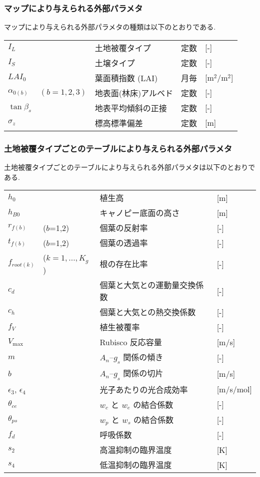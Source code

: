\subsubsection{マップにより与えられる外部パラメタ}

マップにより与えられる外部パラメタの種類は以下のとおりである. 

\begin{tabular}{lllll}
 $I_L$ & & 土地被覆タイプ   & 定数 & [-] \\
 $I_S$ & & 土壌タイプ       & 定数 & [-] \\
 $LAI_0$ & & 葉面積指数 (LAI) & 月毎 & [m$^2$/m$^2$] \\
 $\alpha_{0(b)}$ & $(b=1,2,3)$ & 地表面(林床)アルベド & 定数 & [-] \\
 $\tan\beta_{s}$ & & 地表平均傾斜の正接 & 定数 & [-] \\
 $\sigma_z$ & & 標高標準偏差 & 定数 & [m]
\end{tabular}

\subsubsection{土地被覆タイプごとのテーブルにより与えられる外部パラメタ}

土地被覆タイプごとのテーブルにより与えられる外部パラメタは以下のとおりで
ある. 

\begin{tabular}{llll}
$h_0$ & & 植生高 & [m] \\
$h_{B0}$ & & キャノピー底面の高さ & [m] \\
$r_{f(b)}$ & ($b$=1,2) & 個葉の反射率 & [-] \\
$t_{f(b)}$ & ($b$=1,2) & 個葉の透過率 & [-] \\
$f_{root(k)}$ & ($k=1,\ldots,K_g$) & 根の存在比率 & [-] \\
$c_d$ & & 個葉と大気との運動量交換係数 & [-] \\
$c_h$ & & 個葉と大気との熱交換係数 & [-] \\
$f_V$ & & 植生被覆率 & [-] \\
$V_{\max}$ & & Rubisco 反応容量 & [m/s] \\
$m$ & & $A_n$--$g_s$ 関係の傾き & [-] \\
$b$ & & $A_n$--$g_s$ 関係の切片 & [m/s] \\
$\epsilon_3$, $\epsilon_4$ & & 光子あたりの光合成効率 & [m/s/mol] \\
$\theta_{ce}$ & & $w_c$ と $w_e$ の結合係数 & [-] \\
$\theta_{ps}$ & & $w_p$ と $w_s$ の結合係数 & [-] \\
$f_d$ & & 呼吸係数 & [-] \\
$s_2$ & & 高温抑制の臨界温度 & [K] \\
$s_4$ & & 低温抑制の臨界温度 & [K]
\end{tabular}

